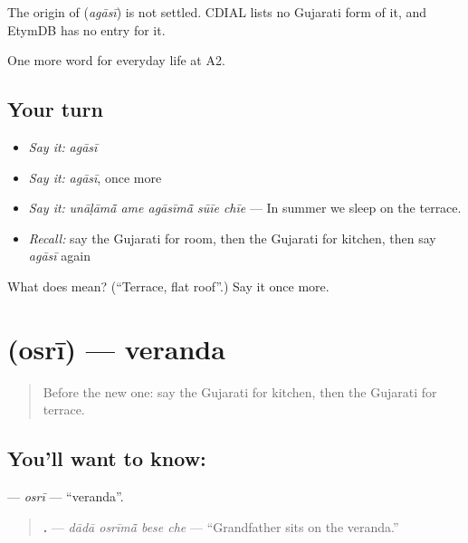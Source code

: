 \begin{cousinweb}
The origin of \textbf{} (\emph{agāsī}) is not settled. CDIAL lists no Gujarati form of it, and EtymDB has no entry for it.
\end{cousinweb}

\begin{grammarlens}[title={What you've built}]
One more word for everyday life at A2.
\end{grammarlens}

\subsection*{Your turn}
\begin{itemize}
\raggedright
  \item \emph{Say it:} \emph{agāsī}
  \item \emph{Say it:} \emph{agāsī}, once more
  \item \emph{Say it:} \emph{unāḷāmā̃ ame agāsīmā̃ sūīe chīe} — In summer we sleep on the terrace.
  \item \emph{Recall:} say the Gujarati for room, then the Gujarati for kitchen, then say \emph{agāsī} again
\end{itemize}

\begin{tcolorbox}[breakable,colback=teal!4,colframe=teal!35!black,title={Before you move on}]
What does  mean? (\textquotedblleft{}Terrace, flat roof\textquotedblright{}.) Say it once more.
\end{tcolorbox}
\section[\texorpdfstring{\gu{ઓસરી} (osrī)}{ઓસરી (osrī)}]{ (osrī) — veranda}

\label{lesson:GU-C153-osri}



\begin{quote}
Before the new one: say the Gujarati for kitchen, then the Gujarati for terrace.
\end{quote}

\subsection*{You'll want to know: }
\textbf{} — \emph{osrī} — \textquotedblleft{}veranda\textquotedblright{}.

\begin{quote}
\textbf{   .} — \emph{dādā osrīmā̃ bese che} — \textquotedblleft{}Grandfather sits on the veranda.\textquotedblright{}
\end{quote}

